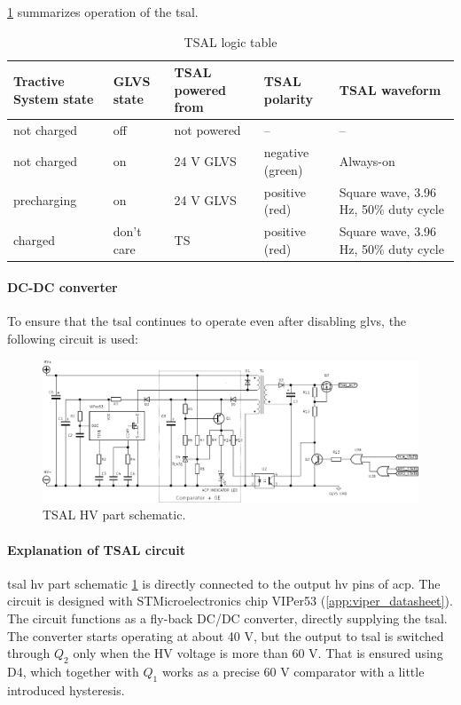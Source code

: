 \ref{fig:TSAL-logic-table} summarizes operation of the \gls{tsal}.

\begin{table}[H]
	\centering
	\caption{TSAL logic table}
	\begin{tabularx}{\textwidth}{|X|X|X|X|X|}
		\hline
		\textbf{Tractive System state} & \textbf{GLVS state} & \textbf{TSAL powered from} & \textbf{TSAL polarity} & \textbf{TSAL waveform} \\
		\hline
		not charged & off & not powered & -- & -- \\
		\hline
		not charged & on & 24 V GLVS & negative (green) & Always-on \\
		\hline
		precharging & on & 24 V GLVS & positive (red) & Square wave, 3.96 Hz, 50\% duty cycle \\
		\hline
		charged & don't care & TS & positive (red) & Square wave, 3.96 Hz, 50\% duty cycle \\
		\hline
	\end{tabularx}%
	\label{fig:TSAL-logic-table}
\end{table}%

\paragraph{DC-DC converter}

To ensure that the \gls{tsal} continues to operate even after disabling \gls{glvs}, the following circuit is used:

\begin{figure}[H]
	\centering
	\includegraphics[width=\textwidth]{./img/ECUA_TSAL_POWER.pdf}
	\caption{TSAL HV part schematic.}
	\label{fig:TSAL-HV}
\end{figure}

\paragraph{Explanation of TSAL circuit}
\Gls{tsal} \gls{hv} part schematic \ref{fig:TSAL-HV} is directly connected to the output \gls{hv} pins of \gls{acp}. The circuit is designed with STMicroelectronics chip VIPer53 (\ref{app:viper_datasheet}). The circuit functions as a fly-back DC/DC converter, directly supplying the \gls{tsal}. The converter starts operating at about 40 V, but the output to \gls{tsal} is switched through $Q_2$ only when the HV voltage is more than 60 V. That is ensured using D4, which together with $Q_1$ works as a precise 60 V comparator with a little introduced hysteresis.

